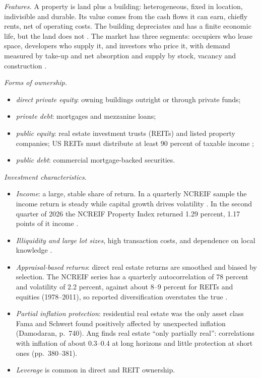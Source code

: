 \begin{qfdefinition}\label{def:real-estate-characteristics}
 \emph{Features.} A property is land plus a building: heterogeneous, fixed in location, indivisible and durable. Its value comes from the cash flows it can earn, chiefly rents, net of operating costs. The building depreciates and has a finite economic life, but the land does not \citep[pp.~739--740]{investment-valuation-2012}. The market has three segments: occupiers who lease space, developers who supply it, and investors who price it, with demand measured by take-up and net absorption and supply by stock, vacancy and construction \citep[pp.~5--15]{tsolacos-real-estate-2021}.

\emph{Forms of ownership.}
\begin{itemize}
\item \emph{direct private equity}: owning buildings outright or through private funds;
\item \emph{private debt}: mortgages and mezzanine loans;
\item \emph{public equity}: real estate investment trusts (REITs) and listed property companies; US REITs must distribute at least 90 percent of taxable income \citep[p.~376]{s7-ang};
\item \emph{public debt}: commercial mortgage-backed securities.
\end{itemize}

\emph{Investment characteristics.}
\begin{itemize}
\item \emph{Income}: a large, stable share of return. In a quarterly NCREIF sample the income return is steady while capital growth drives volatility \citep[pp.~17--18]{tsolacos-real-estate-2021}. In the second quarter of 2026 the NCREIF Property Index returned 1.29 percent, 1.17 points of it income \citep[p.~1]{ncreif-npi-2026q2}.
\item \emph{Illiquidity and large lot sizes}, high transaction costs, and dependence on local knowledge \citep[pp.~741, 747]{investment-valuation-2012}.
\item \emph{Appraisal-based returns}: direct real estate returns are smoothed and biased by selection. The NCREIF series has a quarterly autocorrelation of 78 percent and volatility of 2.2 percent, against about 8--9 percent for REITs and equities (1978--2011), so reported diversification overstates the true \citep[pp.~376--378]{s7-ang}.
\item \emph{Partial inflation protection}: residential real estate was the only asset class Fama and Schwert found positively affected by unexpected inflation (Damodaran, p.~740). Ang finds real estate ``only partially real'': correlations with inflation of about 0.3--0.4 at long horizons and little protection at short ones (pp.~380--381).
\item \emph{Leverage} is common in direct and REIT ownership.
\end{itemize}


\end{qfdefinition}

